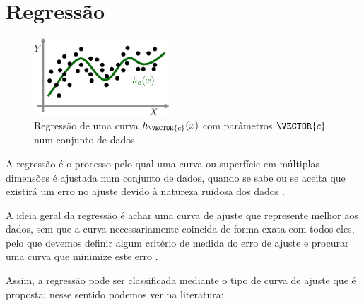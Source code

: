\section{Regressão}


\begin{figure}
     \centering
     \includegraphics[width=0.45\textwidth]{chapters/notacao/regressao1.eps}
     \caption{Regressão de uma curva $h_{\VECTOR{c}}(x)$ com parâmetros $\VECTOR{c}$ num conjunto de dados. }
     \label{fig:regressao:1}
    \hspace{20pt}
\end{figure}
A regressão é o processo pelo qual uma curva ou superfície em múltiplas dimensões é 
ajustada num conjunto de dados, quando se sabe ou se aceita que existirá um erro no ajuste
devido à natureza ruidosa dos dados \cite[pp. 5]{chapra2016metodos}.

A ideia geral da regressão é achar uma curva de ajuste que represente melhor 
aos dados, sem que a curva necessariamente coincida de forma exata com todos eles,
pelo que devemos definir algum critério de medida do erro de ajuste 
e procurar uma curva que minimize este erro \cite[pp. 7]{chapra2016metodos}.

Assim, a regressão pode ser classificada mediante o tipo de curva de ajuste que é proposta;
nesse sentido podemos ver na literatura:

